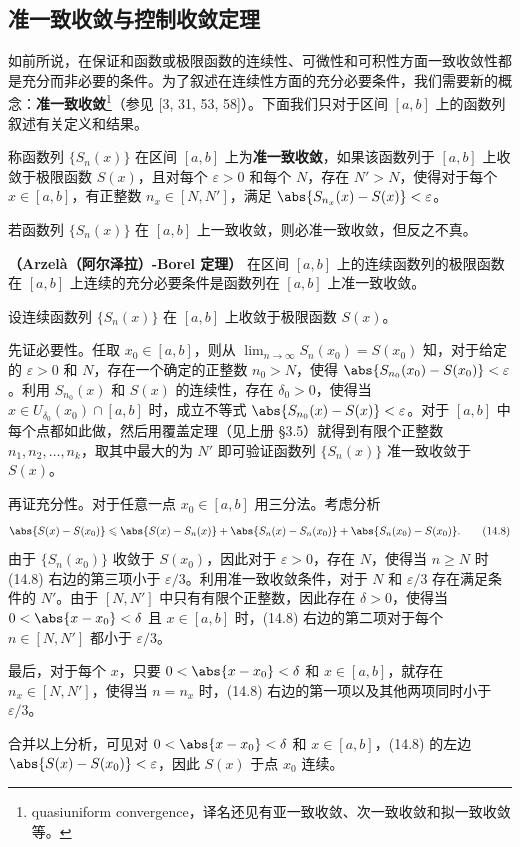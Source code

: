 \subsection{准一致收敛与控制收敛定理}

如前所说，在保证和函数或极限函数的连续性、可微性和可积性方面一致收敛性都是充分而非必要的条件。为了叙述在连续性方面的充分必要条件，我们需要新的概念：\textbf{准一致收敛}\footnote{quasiuniform convergence，译名还见有亚一致收敛、次一致收敛和拟一致收敛等。}（参见 [3, 31, 53, 58]）。下面我们只对于区间 $[a,b]$ 上的函数列叙述有关定义和结果。

\begin{xdefinition}
称函数列 $\{S_n(x)\}$ 在区间 $[a,b]$ 上为\textbf{准一致收敛}，如果该函数列于 $[a,b]$ 上收敛于极限函数 $S(x)$，且对每个 $\varepsilon>0$ 和每个 $N$，存在 $N'>N$，使得对于每个 $x\in[a,b]$，有正整数 $n_x\in[N,N']$，满足 $\abs{S_{n_x}(x)-S(x)}<\varepsilon$。
\end{xdefinition}

\begin{xremark}
若函数列 $\{S_n(x)\}$ 在 $[a,b]$ 上一致收敛，则必准一致收敛，但反之不真。
\end{xremark}

\begin{xproposition}[14.2.3]
\textbf{（Arzelà（阿尔泽拉）-Borel 定理）} 在区间 $[a,b]$ 上的连续函数列的极限函数在 $[a,b]$ 上连续的充分必要条件是函数列在 $[a,b]$ 上准一致收敛。
\end{xproposition}
\begin{xproof}
设连续函数列 $\{S_n(x)\}$ 在 $[a,b]$ 上收敛于极限函数 $S(x)$。

先证必要性。任取 $x_0\in[a,b]$，则从 $\displaystyle\lim_{n\to\infty}S_n(x_0)=S(x_0)$ 知，对于给定的 $\varepsilon>0$ 和 $N$，存在一个确定的正整数 $n_0>N$，使得 $\abs{S_{n_0}(x_0)-S(x_0)}<\varepsilon$。利用 $S_{n_0}(x)$ 和 $S(x)$ 的连续性，存在 $\delta_0>0$，使得当 $x\in U_{\delta_0}(x_0)\cap[a,b]$ 时，成立不等式 $\abs{S_{n_0}(x)-S(x)}<\varepsilon$。对于 $[a,b]$ 中每个点都如此做，然后用覆盖定理（见上册 §3.5）就得到有限个正整数 $n_1,n_2,\ldots,n_k$，取其中最大的为 $N'$ 即可验证函数列 $\{S_n(x)\}$ 准一致收敛于 $S(x)$。

再证充分性。对于任意一点 $x_0\in[a,b]$ 用三分法。考虑分析
\begin{equation}
  \abs{S(x)-S(x_0)}\leqslant\abs{S(x)-S_n(x)}+\abs{S_n(x)-S_n(x_0)}+\abs{S_n(x_0)-S(x_0)}.
  \tag{14.8}
  \label{eq:14.8}
\end{equation}
由于 $\{S_n(x_0)\}$ 收敛于 $S(x_0)$，因此对于 $\varepsilon>0$，存在 $N$，使得当 $n\geqslant N$ 时 (14.8) 右边的第三项小于 $\varepsilon/3$。利用准一致收敛条件，对于 $N$ 和 $\varepsilon/3$ 存在满足条件的 $N'$。由于 $[N,N']$ 中只有有限个正整数，因此存在 $\delta>0$，使得当 $0<\abs{x-x_0}<\delta$ 且 $x\in[a,b]$ 时，(14.8) 右边的第二项对于每个 $n\in[N,N']$ 都小于 $\varepsilon/3$。

最后，对于每个 $x$，只要 $0<\abs{x-x_0}<\delta$ 和 $x\in[a,b]$，就存在 $n_x\in[N,N']$，使得当 $n=n_x$ 时，(14.8) 右边的第一项以及其他两项同时小于 $\varepsilon/3$。

合并以上分析，可见对 $0<\abs{x-x_0}<\delta$ 和 $x\in[a,b]$，(14.8) 的左边 $\abs{S(x)-S(x_0)}<\varepsilon$，因此 $S(x)$ 于点 $x_0$ 连续。
\end{xproof}

